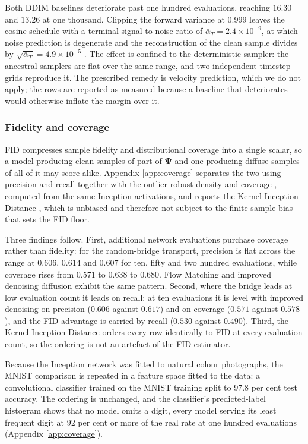 Both DDIM baselines deteriorate past one hundred evaluations, reaching $16.30$
and $13.26$ at one thousand. Clipping the forward variance at $0.999$ leaves the
cosine schedule with a terminal signal-to-noise ratio of
$\bar\alpha_T = 2.4\times10^{-9}$, at which noise prediction is degenerate and
the reconstruction of the clean sample divides by
$\sqrt{\bar\alpha_T} = 4.9\times10^{-5}$ \cite{snr2024}. The effect is confined
to the deterministic sampler: the ancestral samplers are flat over the same
range, and two independent timestep grids reproduce it. The prescribed remedy is
velocity prediction, which we do not apply; the rows are reported as measured
because a baseline that deteriorates would otherwise inflate the margin over it.

\subsubsection*{Fidelity and coverage}
\label{sec:gausscoverage}

FID compresses sample fidelity and distributional coverage into a single scalar,
so a model producing clean samples of part of $\boldsymbol{\Psi}$ and one
producing diffuse samples of all of it may score alike. Appendix
\ref{app:coverage} separates the two using precision and recall
\cite{prec2019} together with the outlier-robust density and coverage
\cite{dens2020}, computed from the same Inception activations, and reports the
Kernel Inception Distance \cite{binkowski2018}, which is unbiased and therefore not
subject to the finite-sample bias that sets the FID floor.

Three findings follow. First, additional network evaluations purchase coverage
rather than fidelity: for the random-bridge transport, precision is flat across
the range at $0.606$, $0.614$ and $0.607$ for ten, fifty and two hundred
evaluations, while coverage rises from $0.571$ to $0.638$ to $0.680$. Flow
Matching and improved denoising diffusion exhibit the same pattern. Second,
where the bridge leads at low evaluation count it leads on recall: at ten
evaluations it is level with improved denoising on precision ($0.606$ against
$0.617$) and on coverage ($0.571$ against $0.578$), and the FID advantage is
carried by recall ($0.530$ against $0.490$). Third, the Kernel Inception
Distance orders every row identically to FID at every evaluation count, so the
ordering is not an artefact of the FID estimator.

Because the Inception network was fitted to natural colour photographs, the
MNIST comparison is repeated in a feature space fitted to the data: a
convolutional classifier trained on the MNIST training split to $97.8$ per cent
test accuracy. The ordering is unchanged, and the classifier's predicted-label
histogram shows that no model omits a digit, every model serving its least
frequent digit at $92$ per cent or more of the real rate at one hundred
evaluations (Appendix \ref{app:coverage}).

